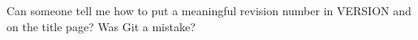 Can someone tell me how to put a meaningful revision number in VERSION
and on the title page? Was Git a mistake?
